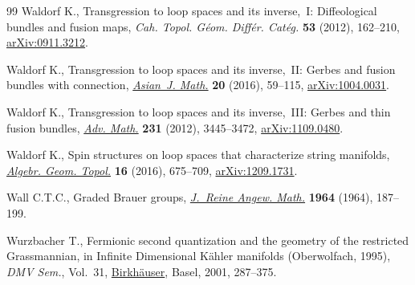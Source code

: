 \documentclass[11pt]{article}
\numberwithin{equation}{section}
\numberwithin{equation}{section}
\begin{document}
\begin{thebibliography}{99}
Waldorf K., Transgression to loop spaces and its inverse,~{I}: {D}iffeological
 bundles and fusion maps, \textit{Cah. Topol. G\'eom. Diff\'er. Cat\'eg.}
 \textbf{53} (2012), 162--210, \href{https://arxiv.org/abs/0911.3212}{arXiv:0911.3212}.

Waldorf K., Transgression to loop spaces and its inverse,~{II}: {G}erbes and
 fusion bundles with connection, \href{https://doi.org/10.4310/AJM.2016.v20.n1.a4}{\textit{Asian~J. Math.}} \textbf{20} (2016),
 59--115, \href{https://arxiv.org/abs/1004.0031}{arXiv:1004.0031}.

Waldorf K., Transgression to loop spaces and its inverse,~{III}: {G}erbes and
 thin fusion bundles,  \href{https://doi.org/10.1016/j.aim.2012.08.016}{\textit{Adv. Math.}} \textbf{231} (2012), 3445--3472,
 \href{https://arxiv.org/abs/1109.0480}{arXiv:1109.0480}.

Waldorf K., Spin structures on loop spaces that characterize string manifolds,
 \href{https://doi.org/10.2140/agt.2016.16.675}{\textit{Algebr. Geom. Topol.}} \textbf{16} (2016), 675--709,
 \href{https://arxiv.org/abs/1209.1731}{arXiv:1209.1731}.

Wall C.T.C., Graded {B}rauer groups, \href{https://doi.org/10.1515/crll.1964.213.187}{\textit{J.~Reine Angew. Math.}}
 \textbf{1964} (1964), 187--199.

Wurzbacher T., Fermionic second quantization and the geometry of the restricted
 {G}rassmannian, in Infinite {D}imensional {K}\"ahler manifolds
 ({O}berwolfach, 1995), \textit{DMV Sem.}, Vol.~31, \href{https://doi.org/10.1007/978-3-0348-8227-9_6}{Birkh\"auser}, Basel, 2001,
 287--375.

\end{thebibliography}
\end{document}
